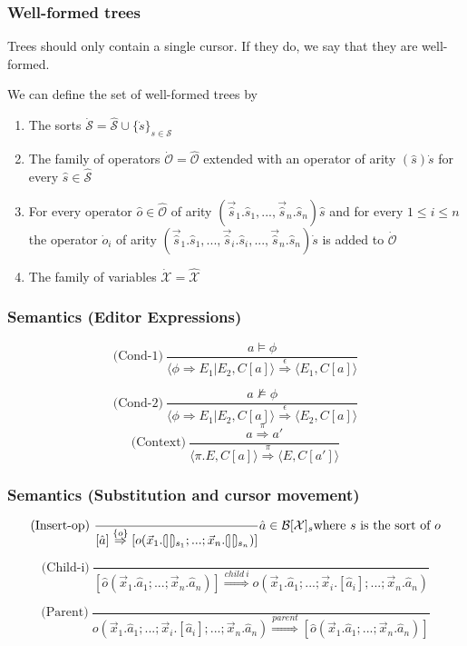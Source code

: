 \documentclass[t,24pt,aspectratio=169]{beamer}
\newcommand{\cleftsemicirc}{\put(3.5,2.5){\oval(5,10)[l]}\put(3.5,-2.5){\line(0,0){10}}\phantom{\circ}}
\newcommand{\crightsemicirc}{\put(1.5,2.5){\oval(5,10)[r]}\put(1.5,-2.5){\line(0,0){10}}\phantom{\circ}}
\newcommand{\hole}{\cleftsemicirc \crightsemicirc}
\begin{document}
\begin{frame}
    \frametitle{Well-formed trees}

    Trees should only contain a single cursor. If they do, we say that
    they are \alert{well-formed}.

    We can define the set of well-formed trees by
    
    \begin{enumerate}
        \item The sorts $\dot{\mathcal{S}} = \hat{\mathcal{S}} \cup \{ \dot{s} \}_{s \in \mathcal{S}}$
        \item The family of operators $\dot{\mathcal{O}} = \hat{\mathcal{O}}$ extended with an operator of arity $(\hat{s})\dot{s}$ for every $\hat{s} \in \hat{\mathcal{S}}$
        \item For every operator $\hat{o} \in \hat{\mathcal{O}}$ of arity $(\vec{\hat{s}}_1.\hat{s}_1,...,\vec{\hat{s}}_n.\hat{s}_n)\hat{s}$ and for every $1 \leq i \leq n$ the operator $\dot{o}_i$ of arity $(\vec{\hat{s}}_1.\hat{s}_1,...,\vec{\hat{s}}_i.\hat{s}_i,...,\vec{\hat{s}}_n.\hat{s}_n)\dot{s}$ is added to $\dot{\mathcal{O}}$
        \item The family of variables $\dot{\mathcal{X}} = \hat{\mathcal{X}}$
    \end{enumerate}
\end{frame}

\begin{frame}
    \frametitle{Semantics (Editor Expressions)}

    \[
        \text{(Cond-1)} \ \frac{a \models \phi}{\langle \phi \Rightarrow E_1|E_2, C[a] \rangle \stackrel{\epsilon}{\Rightarrow} \langle E_1, C[a] \rangle}
    \]

    \[
        \text{(Cond-2)} \ \frac{a \not\models \phi}{\langle \phi \Rightarrow E_1|E_2, C[a] \rangle \stackrel{\epsilon}{\Rightarrow} \langle E_2, C[a] \rangle}
    \]
    \[
        \text{(Context)} \ \frac{a \stackrel{\pi}{\Rightarrow} a'}{\langle \pi.E,C[a] \rangle \stackrel{\pi}{\Rightarrow} \langle E,C[a'] \rangle}
    \]
\end{frame}

\begin{frame}
    \frametitle{Semantics (Substitution and cursor movement)}
    \[
        \text{(Insert-op)} \ \frac{}{[\hat{a}] \stackrel{\{ o \}}{\Rightarrow} [o(\vec{x}_1.\hole_{s_1};...;\vec{x}_n.\hole_{s_n})]} \hat{a} \in \mathcal{B}[\mathcal{X}]_s \text{where } s \text{ is the sort of } o
    \]

    \vspace{1cm}

    \[
        \text{(Child-i)} \ \frac{}{[\hat{o}(\vec{x}_1.\hat{a}_1;...;\vec{x}_n.\hat{a}_n)] \stackrel{child \ i}{\Rightarrow} o(\vec{x}_1.\hat{a}_1;...;\vec{x}_i.[\hat{a}_i];...;\vec{x}_n.\hat{a}_n)}
    \]

    \[
        \text{(Parent)} \ \frac{}{o(\vec{x}_1.\hat{a}_1;...;\vec{x}_i.[\hat{a}_i];...;\vec{x}_n.\hat{a}_n) \stackrel{parent}{\Rightarrow} [\hat{o}(\vec{x}_1.\hat{a}_1;...;\vec{x}_n.\hat{a}_n)]}
    \]
\end{frame}
\end{document}
